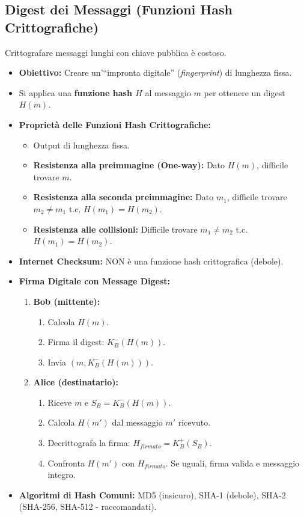 \documentclass{article}
\begin{document}
\subsection{Digest dei Messaggi (Funzioni Hash Crittografiche)}
Crittografare messaggi lunghi con chiave pubblica è costoso.
\begin{itemize}
    \item \textbf{Obiettivo:} Creare un'\textquotedblleft impronta digitale\textquotedblright{} (\textit{fingerprint}) di lunghezza fissa.
    \item Si applica una \textbf{funzione hash $H$} al messaggio $m$ per ottenere un digest $H(m)$.
    \item \textbf{Proprietà delle Funzioni Hash Crittografiche:}
    \begin{itemize}
        \item Output di lunghezza fissa.
        \item \textbf{Resistenza alla preimmagine (One-way):} Dato $H(m)$, difficile trovare $m$.
        \item \textbf{Resistenza alla seconda preimmagine:} Dato $m_1$, difficile trovare $m_2 \neq m_1$ t.c. $H(m_1) = H(m_2)$.
        \item \textbf{Resistenza alle collisioni:} Difficile trovare $m_1 \neq m_2$ t.c. $H(m_1) = H(m_2)$.
    \end{itemize}
    \item \textbf{Internet Checksum:} NON è una funzione hash crittografica (debole).
    \item \textbf{Firma Digitale con Message Digest:}
    \begin{enumerate}
        \item \textbf{Bob (mittente):}
        \begin{enumerate}
            \item Calcola $H(m)$.
            \item Firma il digest: $K_B^-(H(m))$.
            \item Invia $(m, K_B^-(H(m)))$.
        \end{enumerate}
        \item \textbf{Alice (destinatario):}
        \begin{enumerate}
            \item Riceve $m$ e $S_B = K_B^-(H(m))$.
            \item Calcola $H(m')$ dal messaggio $m'$ ricevuto.
            \item Decrittografa la firma: $H_{firmato} = K_B^+(S_B)$.
            \item Confronta $H(m')$ con $H_{firmato}$. Se uguali, firma valida e messaggio integro.
        \end{enumerate}
    \end{enumerate}
    \item \textbf{Algoritmi di Hash Comuni:} MD5 (insicuro), SHA-1 (debole), SHA-2 (SHA-256, SHA-512 - raccomandati).
\end{itemize}
\end{document}
